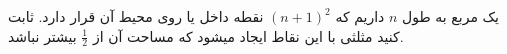 یک مربع به طول $n$ داریم که $(n + 1)^2$ نقطه داخل یا روی محیط آن قرار دارد.
ثابت کنید مثلثی با این نقاط ایجاد میشود که مساحت آن از $\frac{1}{2}$ بیشتر نباشد.